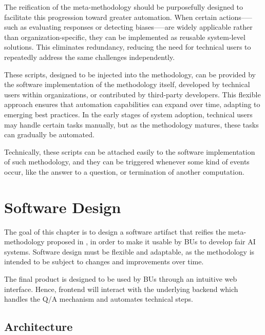\documentclass[12pt,a4paper,openright,twoside]{book}
\begin{document}
The reification of the meta-methodology should be purposefully designed to facilitate this progression toward greater automation. 
%
When certain actions--—such as evaluating responses or detecting biases--—are widely applicable rather than organization-specific, they can be implemented as reusable system-level solutions.
%
This eliminates redundancy, reducing the need for technical users to repeatedly address the same challenges independently.

These scripts, designed to be injected into the methodology, can be provided by the software implementation of the methodology itself, developed by technical users within organizations, or contributed by third-party developers.
%
This flexible approach ensures that automation capabilities can expand over time, adapting to emerging best practices.
%
In the early stages of system adoption, technical users may handle certain tasks manually, but as the methodology matures, these tasks can gradually be automated.

Technically, these scripts can be attached easily to the  software implementation of such methodology, and they can be triggered whenever some kind of events occur, like the answer to a question, or termination of another computation.



\chapter{Software Design}%
\label{chap:design}

The goal of this chapter is to design a software artifact that reifies the meta-methodology proposed in , 
in order to make it usable by \acp{BU} to develop fair \ac{AI} systems.
%
Software design must be flexible and adaptable, as the methodology is intended to be subject to changes and improvements over time.

The final product is designed to be used by \acp{BU} through an intuitive web interface.
%
Hence, frontend will interact with the underlying backend which handles the \ac{Q/A} mechanism and automates technical steps.

\section{Architecture}
\end{document}
